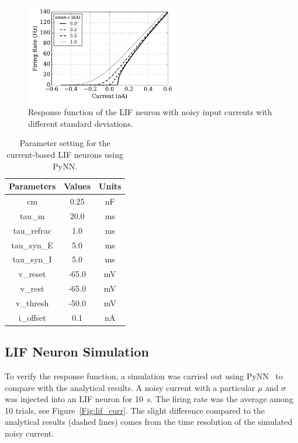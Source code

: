 	\begin{figure}
		\centering
		\includegraphics[width=0.6\textwidth]{pics_iconip/1.pdf}
		\caption{Response function of the LIF neuron with noisy input currents with different standard deviations.}
		\label{Fig:physics}
	\end{figure}
	
	\begin{table}[bt]
		\centering
		\caption{\label{tbl:pynnConfig}Parameter setting for the current-based LIF neurons using PyNN.}
		\bgroup
		\def\arraystretch{1.4}
		\begin{tabular}{c c c}
					Parameters & Values & Units \\
					\hline
					cm & 0.25 & nF	\\
					tau\_m & 20.0 & ms\\
					tau\_refrac & 1.0 & ms\\
					tau\_syn\_E & 5.0 & ms\\
					tau\_syn\_I & 5.0 & ms\\
					v\_reset & -65.0 & mV\\
					v\_rest & -65.0 & mV\\
					v\_thresh & -50.0 & mV\\
					i\_offset & 0.1 & nA\\
			\hline
		\end{tabular}
		\egroup
	\end{table}
	
	
	
	\subsection{LIF Neuron Simulation}
	To verify the response function, a simulation was carried out using PyNN~\cite{davison2008pynn} to compare with the analytical results.
	A noisy current with a particular $\mu$ and $\sigma$ was injected into an LIF neuron for 10~s.
	The firing rate was the average among 10 trials, see Figure~\ref{Fig:lif_curr}.
	The slight difference compared to the analytical results (dashed lines) comes from the time resolution of the simulated noisy current.
	
